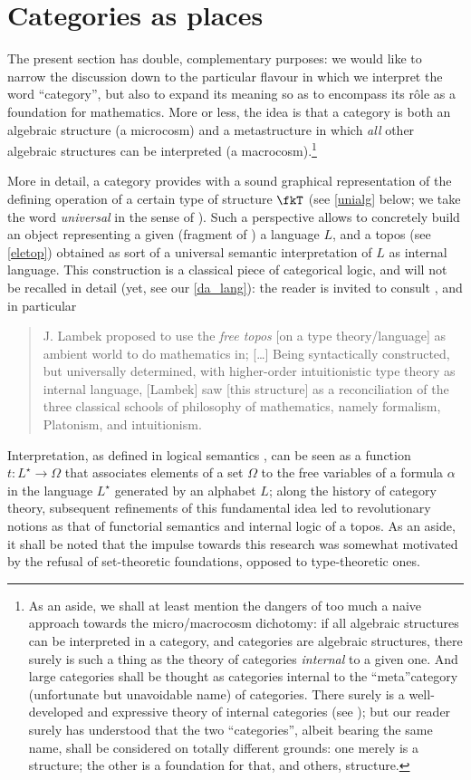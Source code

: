 \section{Categories as places}\label{as_places}
The present section has double, complementary purposes: we would like to narrow the discussion down to the particular flavour in which we interpret the word ``category'', but also to expand its meaning so as to encompass its r\^ole as a foundation for mathematics. More or less, the idea is that a category is both an algebraic structure (a microcosm) and a metastructure in which \emph{all} other algebraic structures can be interpreted (a macrocosm).\footnote{As an aside, we shall at least mention the dangers of too much a naive approach towards the micro/macrocosm dichotomy: if all algebraic structures can be interpreted in a category, and categories are algebraic structures, there surely is such a thing as the theory of categories \emph{internal} to a given one. And large categories shall be thought as categories internal to the ``meta''category (unfortunate but unavoidable name) of categories. There surely is a well-developed and expressive theory of internal categories (see \cite[8]{Bor1}); but our reader surely has understood that the two ``categories'', albeit bearing the same name, shall be considered on totally different grounds: one merely is a structure; the other is a foundation for that, and others, structure.}

More in detail, a category provides with a sound graphical representation of the defining operation of a certain type of structure $\fkT$ (see \autoref{unialg} below; we take the word \emph{universal} in the sense of \cite[XV.1]{grillet2007abstract}).
Such a perspective allows to concretely build an object representing a given (fragment of ) a language $L$, and a topos (see \autoref{eletop}) obtained as sort of a universal semantic interpretation of $L$ as internal language. This construction is a classical piece of categorical logic, and will not be recalled in detail (yet, see our \autoref{da_lang}): the reader is invited to consult \cite[II.12, 13, 14]{lambek1988introduction}, and in particular
\begin{quote}
	J. Lambek proposed to use the \emph{free topos} [on a type theory/language] as ambient world to do mathematics in; [\dots\unkern] Being syntactically constructed, but universally determined, with higher-order intuitionistic type theory as internal language, [Lambek] saw [this structure] as a reconciliation of the three classical schools of philosophy of mathematics, namely formalism, Platonism, and intuitionism. \hfill\cite{free_topos}
\end{quote}
Interpretation, as defined in logical semantics \cite{gamut1991logic}, can be seen as a function $t: L^\star \to \Omega$ that associates elements of a set $\Omega$ to the free variables of a formula $\alpha$ in the language $L^\star$ generated by an alphabet $L$; along the history of category theory, subsequent refinements of this fundamental idea led to revolutionary notions as that of functorial semantics and internal logic of a topos.
As an aside, it shall be noted that the impulse towards this research was somewhat motivated by the refusal of set-theoretic foundations, opposed to type-theoretic ones.

